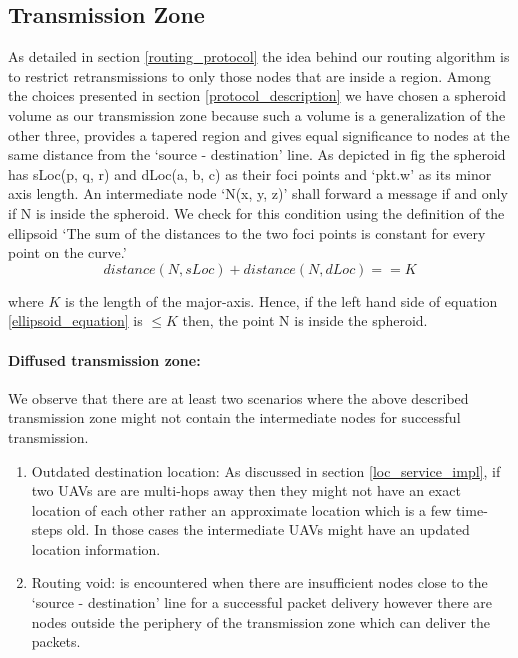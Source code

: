 \subsection{Transmission Zone}

As detailed in section \ref{routing_protocol} the idea behind our routing algorithm is to restrict retransmissions to only those nodes that are inside a region. Among the choices presented in section \ref{protocol_description} we have chosen a spheroid volume as our transmission zone because such a volume is a generalization of the other three, provides a tapered region and gives equal significance to nodes at the same distance from the `source - destination' line. As depicted in fig  the spheroid has sLoc(p, q, r) and dLoc(a, b, c) as their foci points and `pkt.w' as its minor axis length. An intermediate node `N(x, y, z)' shall forward a message if and only if N is inside the spheroid. We check for this condition using the definition of the ellipsoid `The sum of the distances to the two foci points is constant for every point on the curve.'
\begin{equation} \label{ellipsoid_equation}
    distance(N, sLoc) + distance(N, dLoc) == K
\end{equation}

where $K$ is the length of the major-axis. Hence, if the left hand side of equation \ref{ellipsoid_equation} is $\leq K$ then, the point N is inside the spheroid.

\paragraph{Diffused transmission zone:}
\label{diffuse_trans_zone}
We observe that there are at least two scenarios where the above described transmission zone might not contain the intermediate nodes for successful transmission. 
\begin{enumerate}
    \item Outdated destination location: As discussed in section \ref{loc_service_impl}, if two UAVs are are multi-hops away then they might not have an exact location of each other rather an approximate location which is a few time-steps old. In those cases the intermediate UAVs might have an updated location information. 
    
    \item Routing void: is encountered when there are insufficient nodes close to the `source - destination' line for a successful packet delivery however there are nodes outside the periphery of the transmission zone which can deliver the packets.  
\end{enumerate}

